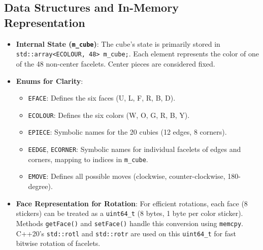 \documentclass[11pt, a4paper]{article}
\begin{document}
\subsection{Data Structures and In-Memory Representation}
\begin{itemize}
    \item \textbf{Internal State (\texttt{m\_cube})}: The cube's state is primarily stored in \texttt{std::array<ECOLOUR, 48> m\_cube;}. Each element represents the color of one of the 48 non-center facelets. Center pieces are considered fixed.
    \item \textbf{Enums for Clarity}:
    \begin{itemize}
        \item \texttt{EFACE}: Defines the six faces (U, L, F, R, B, D).
        \item \texttt{ECOLOUR}: Defines the six colors (W, O, G, R, B, Y).
        \item \texttt{EPIECE}: Symbolic names for the 20 cubies (12 edges, 8 corners).
        \item \texttt{EEDGE}, \texttt{ECORNER}: Symbolic names for individual facelets of edges and corners, mapping to indices in \texttt{m\_cube}.
        \item \texttt{EMOVE}: Defines all possible moves (clockwise, counter-clockwise, 180-degree).
    \end{itemize}
    \item \textbf{Face Representation for Rotation}: For efficient rotations, each face (8 stickers) can be treated as a \texttt{uint64\_t} (8 bytes, 1 byte per color sticker). Methods \texttt{getFace()} and \texttt{setFace()} handle this conversion using \texttt{memcpy}. C++20's \texttt{std::rotl} and \texttt{std::rotr} are used on this \texttt{uint64\_t} for fast bitwise rotation of facelets.
\end{itemize}
\end{document}
